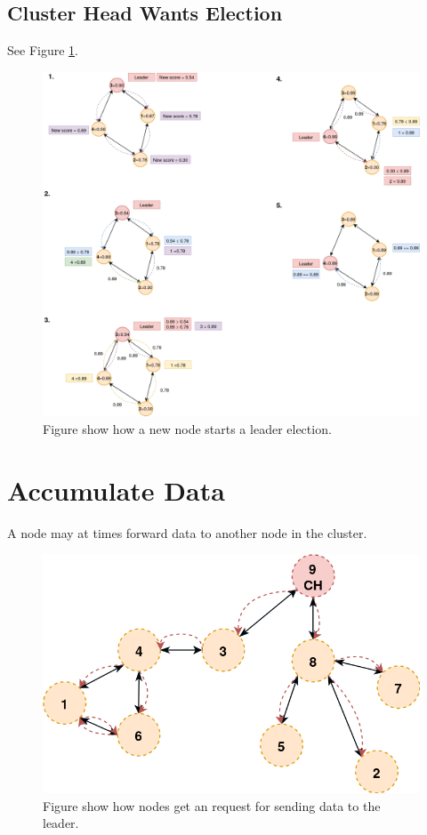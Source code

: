\documentclass[USenglish]{uit-thesis}
\begin{document}
\subsection{Cluster Head Wants Election}
See Figure \ref{fig:chWantsLeaderElection}.

\begin{figure}
\centering
\includegraphics[width=\textwidth]{LeaderNewLeaderElection2.png}
\caption{Figure show how a new node starts a leader election.}
\label{fig:chWantsLeaderElection}
\end{figure}


\section{Accumulate Data}
A node may at times forward data to another node in the cluster.

\begin{figure}
\centering
\includegraphics[width=\textwidth]{gatherData.png}
\caption{Figure show how nodes get an request for sending data to the leader.}
\label{fig:gatherData}
\end{figure}
\end{document}
